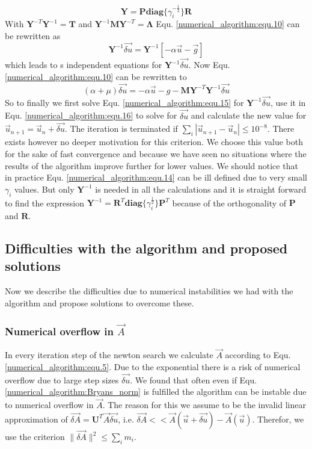 \begin{equation}
	\mathbf{Y} = \mathbf{P} \mathbf{diag}\{ \gamma_i^{-\frac{1}{2}}\} \mathbf{R}
	\label{numerical_algorithm:equ.14}
\end{equation}
With $\mathbf{Y}^{-T}\mathbf{Y}^{-1} = \mathbf{T}$ and $\mathbf{Y}^{-1}\mathbf{M}\mathbf{Y}^{-T} = \mathbf{\Lambda}$ Equ. 
\ref{numerical_algorithm:equ.10}
can be rewritten as
\begin{equation}
	[( \alpha + \mu) \mathbf{I} +\mathbf{\Lambda}]\mathbf{Y}^{-1} \vec{\delta u} = \mathbf{Y}^{-1}[ -\alpha \vec u - \vec g]
	\label{numerical_algorithm:equ.15}
\end{equation}
which leads to s independent equations for $\mathbf{Y}^{-1} \vec{\delta u}$.
Now Equ. \ref{numerical_algorithm:equ.10} can be rewritten to
\begin{equation}
	(\alpha + \mu)\vec{\delta u} = -\alpha \vec u - g - \mathbf{M}\mathbf{Y}^{-T}\mathbf{Y}^{-1} \vec{\delta u}
	\label{numerical_algorithm:equ.16}
\end{equation}
So to finally we first solve Equ. \ref{numerical_algorithm:equ.15} for $\mathbf{Y}^{-1} \vec{\delta u}$, use it in Equ. \ref{numerical_algorithm:equ.16} to solve for $\vec{\delta u}$ and calculate the new value for $\vec u_{n+1} = \vec u_{n} + \vec{\delta u}$. The iteration is terminated if $\sum_i |\vec u_{n+1} - \vec u_{n}| \leq 10^{-8}$. There exists however no deeper motivation for this criterion. 
We choose this value both for the sake of fast convergence and because we have seen no situations where the results of the algorithm improve further for lower values.\newline
We should notice that in practice Equ. \ref{numerical_algorithm:equ.14} can be ill defined due to very small $\gamma_i$ values. But only $\mathbf{Y}^{-1}$ is needed in all the calculations and it is straight forward to find the expression $\mathbf{Y}^{-1} = \mathbf{R}^T \mathbf{diag} \{ \gamma_i^{\frac{1}{2}}\}\mathbf{P}^T$ because of the orthogonality of $\mathbf{P}$ and $\mathbf{R}$.
\subsection*{Difficulties with the algorithm and proposed solutions}
Now we describe the difficulties due to numerical instabilities we had with the algorithm and propose solutions to overcome these.
\subsubsection*{Numerical overflow in $\vec A$}
In every iteration step of the newton search we calculate $\vec A$ according to Equ. \ref{numerical_algorithm:equ.5}.
Due to the exponential there is a risk of numerical overflow due to large step sizes $\vec{\delta u}$. 
We found that often even if Equ. \ref{numerical_algorithm:Bryans_norm} is fulfilled the algorithm can be instable due to numerical overflow in $\vec A$.
The reason for this we assume to be the invalid linear approximation of $\vec {\delta A} = \mathbf{U}^T \vec A\vec{\delta u}$, i.e. $\vec{\delta A} << \vec A(\vec u + \vec{\delta u}) - \vec A(\vec u)$. 
Therefor, we use the criterion $\parallel \vec{\delta A} \parallel^2 \leq \sum_i m_i$.
